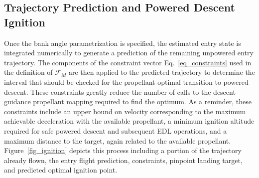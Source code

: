 \documentclass[letterpaper, paper,11pt]{AAS}
\begin{document}
\subsection{Trajectory Prediction and Powered Descent Ignition}
Once the bank angle parametrization is specified, the estimated entry state is integrated numerically to generate a prediction of the remaining unpowered entry trajectory. The components of the constraint vector Eq.~\ref{eq_constraints} used in the definition of $\mathcal{F}_M$ are then applied to the predicted trajectory to determine the interval that should be checked for the propellant-optimal transition to powered descent. These constraints greatly reduce the number of calls to the descent guidance propellant mapping required to find the optimum. As a reminder, these constraints include an upper bound on velocity corresponding to the maximum achievable deceleration with the available propellant, a minimum ignition altitude required for safe powered descent and subsequent EDL operations, and a maximum distance to the target, again related to the available propellant. Figure~\ref{fig_ignition} depicts this process including a portion of the trajectory already flown, the entry flight prediction, constraints, pinpoint landing target, and predicted optimal ignition point. 
\end{document}
